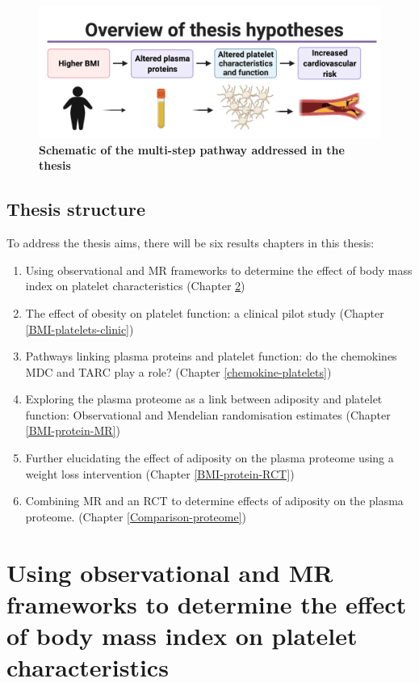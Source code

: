 \documentclass[11pt,twoside]{bristolthesis}
\providecommand{\tightlist}{%
  \setlength{\itemsep}{0pt}\setlength{\parskip}{0pt}}
\begin{document}
\begin{figure}

{\centering \includegraphics{figure/Intro_background/Thesis_graphic_overview_without_chapters} 

}

\caption[Schematic of the multi-step pathway addressed in the thesis]{\textbf{Schematic of the multi-step pathway addressed in the thesis}}\label{fig:Thesis-schematic}
\end{figure}
\hypertarget{thesis-structure}{%
\section{Thesis structure}\label{thesis-structure}}

To address the thesis aims, there will be six results chapters in this thesis:
\begin{enumerate}
\def\labelenumi{\arabic{enumi})}
\tightlist
\item
  Using observational and MR frameworks to determine the effect of body mass index on platelet characteristics (Chapter \ref{BMI-platelets-INTERVAL})
\item
  The effect of obesity on platelet function: a clinical pilot study (Chapter \ref{BMI-platelets-clinic})
\item
  Pathways linking plasma proteins and platelet function: do the chemokines MDC and TARC play a role? (Chapter \ref{chemokine-platelets})
\item
  Exploring the plasma proteome as a link between adiposity and platelet function: Observational and Mendelian randomisation estimates (Chapter \ref{BMI-protein-MR})
\item
  Further elucidating the effect of adiposity on the plasma proteome using a weight loss intervention (Chapter \ref{BMI-protein-RCT})
\item
  Combining MR and an RCT to determine effects of adiposity on the plasma proteome. (Chapter \ref{Comparison-proteome})
\end{enumerate}
\hypertarget{BMI-platelets-INTERVAL}{%
\chapter{Using observational and MR frameworks to determine the effect of body mass index on platelet characteristics}\label{BMI-platelets-INTERVAL}}
\end{document}
